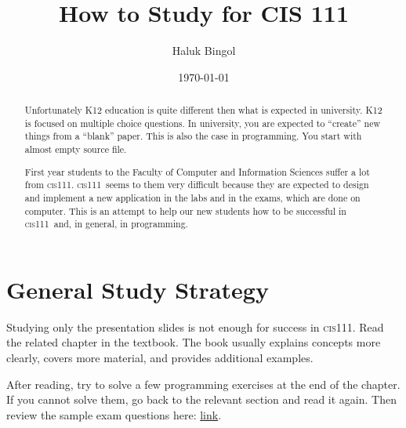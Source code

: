 \documentclass[%
 reprint,
 amsmath,amssymb,
 aps,
]{revtex4-2}
\newcommand{\cisOOO}{\textsc{cis111}}
\begin{document}
\title{How to Study for CIS 111}
\author{
	Haluk Bingol
}
\date{\today}%

\begin{abstract}
	Unfortunately K12 education is quite different then what is expected in university.
	K12 is focused on multiple choice questions.
	In university, you are expected to ``create'' new things from a ``blank'' paper.
	This is also the case in programming.
	You start with almost empty source file.
	
	First year students to the Faculty of Computer and Information Sciences suffer a lot from \cisOOO.
	\cisOOO\ seems to them very difficult because they are expected to design and implement a new application in the labs and in the exams,
	which are done on computer.
	This is an attempt to help our new students how to be successful in \cisOOO\ and, 
	in general, 
	in programming.	
\end{abstract}

\maketitle

\tableofcontents








\section{General Study Strategy}

Studying only the presentation slides is not enough for success in \cisOOO. 
Read the related chapter in the textbook. 
The book usually explains concepts more clearly, covers more material, and 
provides additional examples.

After reading, try to solve a few programming exercises at the end of the chapter. 
If you cannot solve them, go back to the relevant section and read it again. 
Then review the sample exam questions here:
\href{https://drive.google.com/drive/folders/1r1TcJdlwSAhWCe9vA9BqdJSkVTFXkmkM?usp=drive_link}
	{link}.
\end{document}
